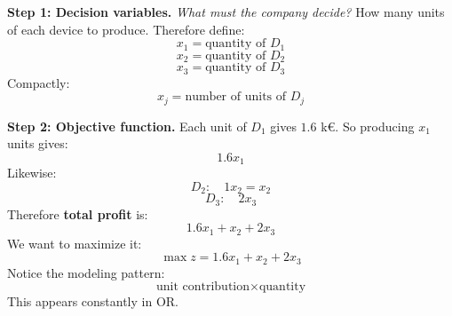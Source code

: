 \begin{examplebox}
    \highspace
    \textcolor{Green3}{ \textbf{Step 1: Decision variables.}} \emph{What must the company decide?} How many units of each device to produce. Therefore define:
    \begin{equation*}
        x_1=\text{quantity of }D_1
    \end{equation*}
    \begin{equation*}
        x_2=\text{quantity of }D_2
    \end{equation*}
    \begin{equation*}
        x_3=\text{quantity of }D_3
    \end{equation*}
    Compactly:
    \begin{equation*}
        x_j=\text{number of units of }D_j
    \end{equation*}

    \highspace
    \textcolor{Green3}{ \textbf{Step 2: Objective function.}} Each unit of $D_1$ gives $1.6$ k\euro. So producing $x_1$ units gives:
    \begin{equation*}
        1.6x_1
    \end{equation*}
    Likewise:
    \begin{equation*}
        D_2:\quad 1x_2 = x_2
    \end{equation*}
    \begin{equation*}
        D_3:\quad 2x_3
    \end{equation*}
    Therefore \textbf{total profit} is:
    \begin{equation*}
        1.6x_1+x_2+2x_3
    \end{equation*}
    We want to maximize it:
    \begin{equation*}
        \boxed{
            \max z=1.6x_1+x_2+2x_3
        }
    \end{equation*}
    Notice the modeling pattern:
    \begin{equation*}
        \text{unit contribution}\times\text{quantity}
    \end{equation*}
    This appears constantly in OR.


\end{examplebox}

